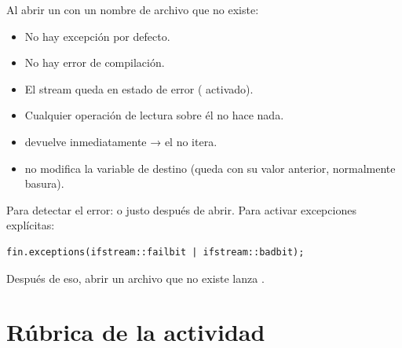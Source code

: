 \documentclass[12pt, oneside]{article}
\begin{document}
\begin{notaprofesor}
  Al abrir un  con un nombre de archivo que no existe:
  \begin{itemize}
    \item No hay excepción por defecto.
    \item No hay error de compilación.
    \item El stream queda en estado de error ( activado).
    \item Cualquier operación de lectura sobre él no hace nada.
    \item {} devuelve inmediatamente  → el
           no itera.
    \item \cpp{>>} no modifica la variable de destino (queda con su
          valor anterior, normalmente basura).
  \end{itemize}
  Para detectar el error:  o  justo
  después de abrir.  Para activar excepciones explícitas:
  \begin{verbatim}
fin.exceptions(ifstream::failbit | ifstream::badbit);
  \end{verbatim}
  Después de eso, abrir un archivo que no existe lanza
  .
\end{notaprofesor}

\section{Rúbrica de la actividad}
\end{document}
